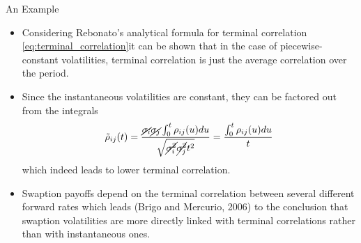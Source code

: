 \documentclass{beamer}
\begin{document}
\begin{frame}{An Example}
\begin{itemize}
	\item<1-> Considering Rebonato's analytical formula for terminal correlation \cref{eq:terminal_correlation}it can be shown that in the case of piecewise-constant volatilities, terminal correlation is just the average correlation over the period. 
  	\item<2-> Since the instantaneous volatilities are constant, they can be factored out from the integrals
	  \begin{equation*}	    \tilde{\rho}_{ij}(t)=\frac{\cancel{\sigma_i}\cancel{\sigma_j}\int_0^t\rho_{ij}(u)du}{\sqrt{\cancel{\sigma_i^2}\cancel{\sigma_j^2} t^2}}= \frac{\int_0^t\rho_{ij}(u)du}{t}		
  	\end{equation*}
  	which indeed leads to lower terminal correlation.
  	\item<3-> Swaption payoffs depend on the terminal correlation between several different forward rates which leads (Brigo and Mercurio, 2006) to the conclusion that swaption volatilities are more directly linked with terminal correlations rather than with instantaneous ones.
  \end{itemize}
\end{frame}
\end{document}
